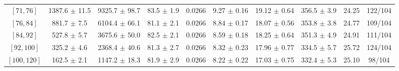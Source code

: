 \begin{tabular}{c||c|c|c|c|c|c|c||c|c}
$[71, 76]$ & 1387.6 $\pm$ 11.5 & 9325.7 $\pm$ 98.7 & 83.5 $\pm$ 1.9 & 0.0266 & 9.27 $\pm$ 0.16 & 19.12 $\pm$ 0.64 & 356.5 $\pm$ 3.9 & 24.25 & 122/104\\
$[76, 84]$ & 881.7 $\pm$ 7.5 & 6104.4 $\pm$ 66.1 & 81.1 $\pm$ 2.1 & 0.0266 & 8.84 $\pm$ 0.17 & 18.07 $\pm$ 0.56 & 353.8 $\pm$ 3.8 & 24.77 & 109/104\\
$[84, 92]$ & 527.8 $\pm$ 5.7 & 3675.6 $\pm$ 50.0 & 82.5 $\pm$ 2.1 & 0.0266 & 8.59 $\pm$ 0.18 & 18.25 $\pm$ 0.64 & 351.3 $\pm$ 4.9 & 24.91 & 111/104\\
$[92, 100]$ & 325.2 $\pm$ 4.6 & 2368.4 $\pm$ 40.6 & 81.3 $\pm$ 2.7 & 0.0266 & 8.32 $\pm$ 0.23 & 17.96 $\pm$ 0.77 & 334.5 $\pm$ 5.7 & 25.72 & 124/104\\
$[100, 120]$ & 162.5 $\pm$ 2.1 & 1147.2 $\pm$ 18.3 & 81.9 $\pm$ 2.9 & 0.0266 & 8.22 $\pm$ 0.22 & 17.03 $\pm$ 0.75 & 332.4 $\pm$ 5.3 & 25.10 & 98/104\\
\end{tabular}
